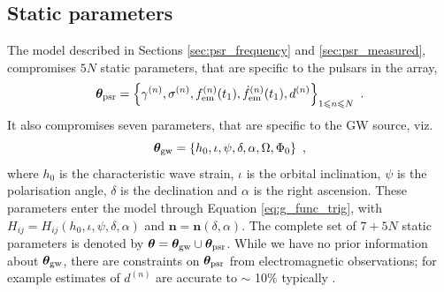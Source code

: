 \documentclass[fleqn,usenatbib,useAMS]{mnras}
\begin{document}
\subsection{Static parameters}\label{sec:ss_params}
The model described in Sections \ref{sec:psr_frequency} and \ref{sec:psr_measured}, compromises $5N$ static parameters, that are specific to the pulsars in the array,
\begin{equation}
	\boldsymbol{\theta}_{\rm psr} = \left \{ \gamma^{(n)},\sigma^{(n)}, f_{\rm em}^{(n)}(t_1),\dot{f}_{\rm em}^{(n)}(t_1),d^{(n)}\right\}_{1\leq n \leq N} \ .  \label{eq:psrparams}
\end{equation}
It also compromises seven parameters, that are specific to the GW source, viz. 
\begin{equation}
	\boldsymbol{\theta}_{\rm gw} = \left \{h_0, \iota, \psi, \delta, \alpha, \Omega, \Phi_0 \right \} \ ,  \label{eq:params3}
\end{equation}
where $h_0$ is the characteristic wave strain, $\iota$ is the orbital inclination, $\psi$ is the polarisation angle, $\delta$ is the declination and $\alpha$ is the right ascension. These parameters enter the model through Equation \eqref{eq:g_func_trig}, with $H_{ij} = H_{ij}(h_0, \iota, \psi, \delta, \alpha)$ and $\boldsymbol{n}=\boldsymbol{n}(\delta,\alpha)$. The complete set of $7 + 5N$ static parameters is denoted by $\boldsymbol{\theta} = \boldsymbol{\theta}_{\rm gw} \cup \boldsymbol{\theta}_{\rm psr}$. While we have no prior information about $\boldsymbol{\theta}_{\rm gw}$, there are constraints on $\boldsymbol{\theta}_{\rm psr}$ from electromagnetic observations; for example estimates of $d^{(n)}$ are accurate to $\sim$ 10$\%$ typically \citep{Cordes2002astro.ph..7156C, Verbiest2012ApJ...755...39V, Desvignes2016,Yao2017}.
\end{document}
